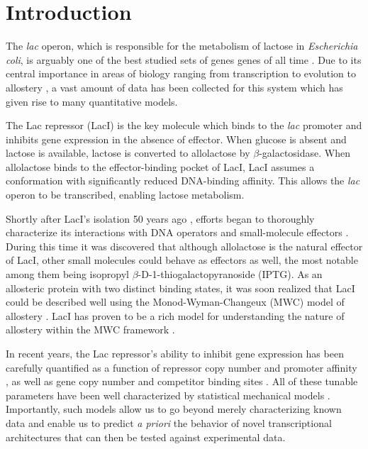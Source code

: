 \section*{Introduction }

The \textit{lac} operon, which is responsible for the metabolism of lactose in
\textit{Escherichia coli}, is arguably one of the best studied sets of genes genes of all time
\cite{MullerHill1996a}. Due to its central importance in areas of biology
ranging from transcription to evolution to allostery \cite{Oehler1994, Razo-Mejia2014, Daber2008, Lakshmi2009, Swint-Kruse2009, Garcia2010, Boedicker2013, Brewster2014, Kuhlman2007}, a vast amount of data has been collected for this
system which has given rise to many quantitative models. 

The Lac repressor (LacI) is the key molecule which binds to the \textit{lac} promoter and inhibits gene expression in the absence of effector. When glucose is absent and lactose is available, lactose is converted to allolactose by $\beta$-galactosidase. When allolactose binds to the effector-binding pocket of LacI, LacI assumes a conformation with significantly reduced DNA-binding affinity. This allows the \textit{lac} operon to be transcribed, enabling lactose metabolism.

Shortly after LacI's isolation 50 years ago \cite{Gilbert1966}, efforts began to thoroughly characterize its interactions with DNA operators and small-molecule effectors \cite{Riggs1970I, Riggs1970II, Riggs1970III, Jobe1972}. During this time it was discovered that although allolactose is the natural effector of LacI, other small molecules could behave as effectors as well, the most notable among them being isopropyl
$\beta$-D-1-thiogalactopyranoside (IPTG). As an allosteric protein with two distinct binding states, it was soon realized that LacI could be described well using the Monod-Wyman-Changeux (MWC) model of allostery \cite{MONOD1965}. LacI has proven to be a rich model for understanding the nature of allostery within the MWC framework \cite{Daly1986, Dunaway1980, Meyer2013, Daber2007, Daber2009, Muller-Hartmann1996, OGorman1980, Sharp2011, Taraban2008, Wilson2007}.

In recent years, the Lac repressor's ability to inhibit gene expression has been carefully quantified
as a function of repressor copy number and promoter affinity \cite{Garcia2011},
as well as gene copy number and competitor binding sites \cite{Weinert2014}. All
of these tunable parameters have been well characterized by statistical
mechanical models \cite{Bintu2005a, Bintu2005b}. Importantly, such models
allow us to go beyond merely characterizing known data and enable
us to predict \textit{a priori} the behavior of novel transcriptional architectures that can then be tested against experimental data.

